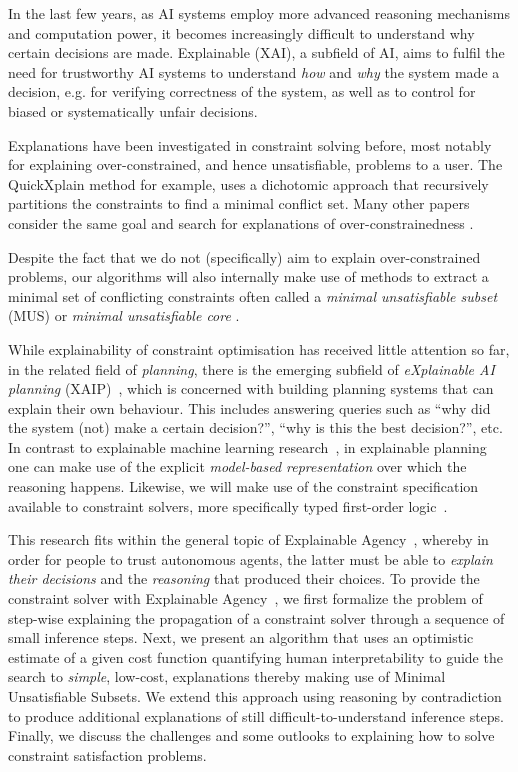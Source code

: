 In the last few years, as AI systems employ more advanced reasoning mechanisms and computation power, it becomes increasingly difficult to understand why certain decisions are made.
Explainable (XAI), a subfield of AI, aims to fulfil the need for trustworthy AI systems to understand \emph{how} and \emph{why} the system made a decision, e.g. for verifying correctness of the system, as well as to control for biased or systematically unfair decisions.

Explanations have been investigated in constraint solving before, most notably for explaining over-constrained, and hence unsatisfiable, problems to a user.
The QuickXplain method \cite{junker2001quickxplain} for example, uses a dichotomic approach that recursively partitions the constraints to find a minimal conflict set.
Many other papers consider the same goal and search for explanations of over-constrainedness \cite{leo2017debugging,zeighami2018towards}.

Despite the fact that we do not (specifically) aim to explain over-constrained problems, our algorithms will also internally make use of methods to extract a minimal set of conflicting constraints often called a \emph{minimal unsatisfiable subset} (MUS) or \emph{minimal unsatisfiable core} \cite{marques2010minimal}.

While explainability of constraint optimisation has received little attention so far, in the related field of \textit{planning}, there is the emerging subfield of \textit{eXplainable AI planning} (XAIP)~\cite{fox2017explainable}, which is concerned with building planning systems that can explain their own behaviour.
This includes answering queries such as ``why did the system (not) make a certain decision?'', ``why is this the best decision?'', etc. In contrast to explainable machine learning research~\cite{guidotti2018survey}, in explainable planning one can make use of the explicit \textit{model-based representation} over which the reasoning happens.
Likewise, we will make use of the constraint specification available to constraint solvers, more specifically typed first-order logic~\cite{atcl/Wittocx13}.

This research fits within the general topic of Explainable Agency~\cite{langley2017explainable}, whereby in order for people to trust autonomous agents, the latter must be able to \textit{explain their decisions} and the \textit{reasoning} that produced their choices.
To provide the constraint solver with Explainable Agency~\cite{langley2017explainable}, we first formalize the problem of step-wise explaining the propagation of a constraint solver through a sequence of small inference steps.
Next, we present an algorithm that uses an optimistic estimate of a given cost function quantifying human interpretability to guide the search to \textit{simple}, low-cost, explanations thereby making use of Minimal Unsatisfiable Subsets.
We extend this approach using reasoning by contradiction to produce additional explanations of still difficult-to-understand inference steps.
Finally, we discuss the challenges and some outlooks to explaining how to solve constraint satisfaction problems.

